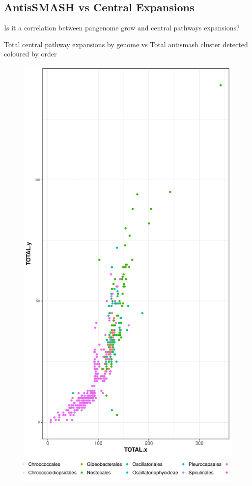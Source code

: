 \documentclass[12pt,twoside]{reedthesis}
\begin{document}
  \subsection{AntisSMASH vs Central
  Expansions}\label{antissmash-vs-central-expansions-2}
  
  Is it a correlation between pangenome grow and central pathways
  expansions?
  
  Total central pathway expansions by genome vs Total antismash cluster
  detected coloured by order
  
  \begin{figure}[h!tbp]
  \centering
  \includegraphics[angle = 0,scale = 0.5]{chapter2/Cyanobacteria/SMASHvsExpansionsbyOrder.pdf}

\end{figure}
\end{document}
